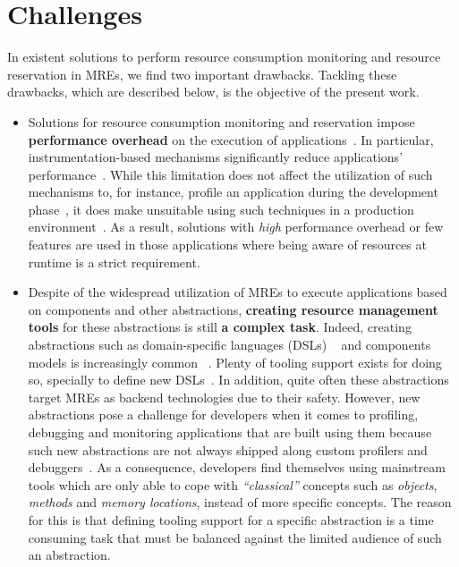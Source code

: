 \section{Challenges}

In existent solutions to perform resource consumption monitoring and resource reservation in MREs, we find two important drawbacks.
Tackling these drawbacks, which are described below, is the objective of the present work.

\begin{itemize}
\item Solutions for resource consumption monitoring and reservation impose \textbf{performance overhead} on the execution of applications~\cite{Binder:2006:FEM:1173706.1173733,Marek:2012:DEL:2162037.2162046,Reiss:2008:CDP:1383559.1383566,Maurel:2012:AME:2304736.2304763}.
In particular, instrumentation-based mechanisms significantly reduce applications' performance~\cite{Dmitriev:2004:PJA:974043.974067,czajkowski_jres:_1998,Binder:2009:PPV:1464245.1464249}.
While this limitation does not affect the utilization of such mechanisms to, for instance, profile an application during the development phase~\cite{czajkowski_jres:_1998,binder_extending_2005,binder_portable_2001,Maebe06javana:a,Moret:2011:PBI:1960275.1960292, Hulaas:2008:PTL}, it does make unsuitable using such techniques in a production environment~\cite{Dmitriev:2004:PJA:974043.974067}.
As a result, solutions with \textit{high} performance overhead or few features are used in those applications where being aware of resources at runtime is a strict requirement.

\item Despite of the widespread utilization of MREs to execute applications based on components and other abstractions, \textbf{creating resource management tools} for these abstractions is still \textbf{a complex task}.
Indeed, creating abstractions such as domain-specific languages (DSLs) ~\cite{van2000domain,Fowler:2010:DSL:1809745} and components models is increasingly common ~\cite{van2000domain,hutchinson2011empirical,whittle2014state}.
Plenty of tooling support exists for doing so, specially to define new DSLs~\cite{raey,Merkle:2010:TMT:1869542.1869564,Eysholdt:2010:XIY:1869542.1869625}.
In addition, quite often these abstractions target MREs as backend technologies due to their safety.
However, new abstractions pose a challenge for developers when it comes to profiling, debugging and monitoring applications that are built using them because such new abstractions are not always shipped along custom profilers and debuggers~\cite{Kolomvatsos:2012:DAC:2148250.2148478,Wu:2008:GGD:1394966.1394970,Mannadiar:2010:DDM:1964571.1964595,Lindeman:2011:DDD:2047862.2047885,Wu:2005:TDL:1094855.1094920,Faith1998}.
As a consequence, developers find themselves using mainstream tools which are only able to cope with \textit{``classical''} concepts such as \textit{objects}, \textit{methods} and \textit{memory locations}, instead of more specific concepts.
The reason for this is that defining tooling support for a specific abstraction is a time consuming task that must be balanced against the limited audience of such an abstraction.
\end{itemize}
 
